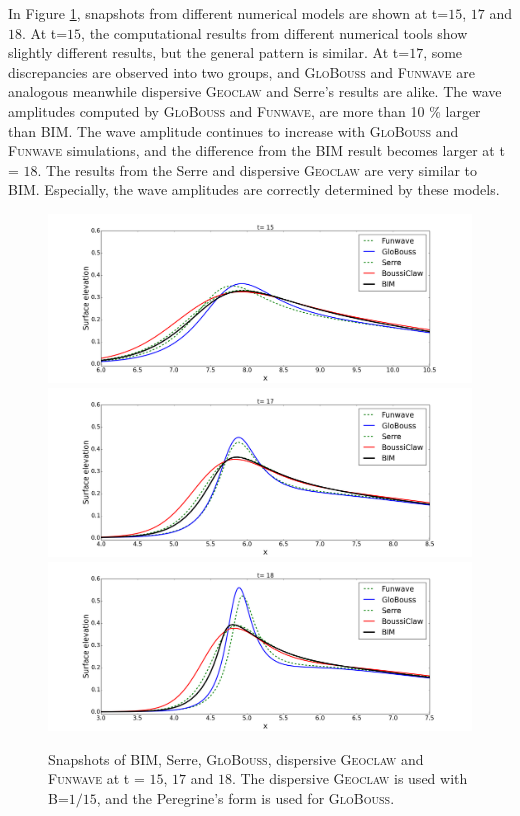 \documentclass[review]{elsarticle}
\begin{document}
In Figure \ref{fig:bim_dgeo_fun}, snapshots from different
numerical models are shown at t=$15$, $17$ and $18$. 
At t=$15$, the computational results
from different numerical tools show slightly different results,
but the general pattern is similar.
At t=$17$, some discrepancies are observed into two groups, and
\textsc{GloBouss} and \textsc{Funwave} 
are analogous meanwhile dispersive \textsc{Geoclaw}
and Serre's results are alike. 
The wave amplitudes computed by \textsc{GloBouss} and \textsc{Funwave},
are more than 10 \% larger than BIM.
The wave amplitude continues to increase 
with \textsc{GloBouss} and \textsc{Funwave} simulations,
and the difference from the BIM result becomes larger at t = $18$. 
The results from the Serre and dispersive \textsc{Geoclaw} are 
very similar to BIM. 
Especially, the wave amplitudes are correctly determined by these models.

\begin{figure}[!htb]
\centering
\includegraphics[width=.9\textwidth]{_fig/bim_dgeo_fun_glob_150.png}\\
\includegraphics[width=.9\textwidth]{_fig/bim_dgeo_fun_glob_170.png}\\
\includegraphics[width=.9\textwidth]{_fig/bim_dgeo_fun_glob_180.png}
\caption{Snapshots of BIM, Serre, \textsc{GloBouss}, dispersive \textsc{Geoclaw}
and \textsc{Funwave} at t = $15$, $17$ and $18$.
The dispersive \textsc{Geoclaw} is used with B=$1/15$,
and the Peregrine's form is used for \textsc{GloBouss}.}
\label{fig:bim_dgeo_fun}
\end{figure}
\end{document}
